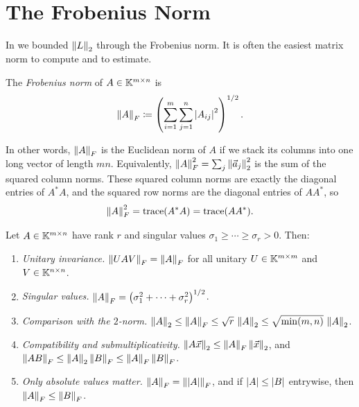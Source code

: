 \section{The Frobenius Norm}
\label{sec:frobenius}

In  we bounded $\left\lVert L \right\rVert_2$ through the Frobenius norm. It is often the easiest matrix norm to compute and to estimate.

\begin{definition}
  The \emph{Frobenius norm} of $A \in \mathbb{K}^{m \times n}$ is
  \begin{equation}
    \left\lVert A \right\rVert_F \coloneqq \left(\sum_{i=1}^{m}\sum_{j=1}^{n}\left\lvert A_{ij} \right\rvert^2\right)^{1/2}.
  \end{equation}
\end{definition}

In other words, $\left\lVert A \right\rVert_F$ is the Euclidean norm of $A$ if we stack its columns into one long vector of length $mn$. Equivalently, $\left\lVert A \right\rVert_F^2 = \sum_j\left\lVert \vec{a}_j \right\rVert_2^2$ is the sum of the squared column norms. These squared column norms are exactly the diagonal entries of $A^\ast A$, and the squared row norms are the diagonal entries of $AA^\ast$, so
\begin{equation}
  \left\lVert A \right\rVert_F^2 = \operatorname{trace}(A^\ast A) = \operatorname{trace}(AA^\ast).
\end{equation}

\begin{proposition}
  \label{prop:frobenius}
  Let $A \in \mathbb{K}^{m \times n}$ have rank $r$ and singular values $\sigma_1 \ge \cdots \ge \sigma_r > 0$. Then:
  \begin{enumerate}
    \item \emph{Unitary invariance.} $\left\lVert UAV \right\rVert_F = \left\lVert A \right\rVert_F$ for all unitary $U \in \mathbb{K}^{m \times m}$ and $V \in \mathbb{K}^{n \times n}$.
    \item \emph{Singular values.} $\left\lVert A \right\rVert_F = \left(\sigma_1^2 + \cdots + \sigma_r^2\right)^{1/2}$.
    \item \emph{Comparison with the $2$-norm.} $\left\lVert A \right\rVert_2 \le \left\lVert A \right\rVert_F \le \sqrt{r}\,\left\lVert A \right\rVert_2 \le \sqrt{\min(m, n)}\,\left\lVert A \right\rVert_2$.
    \item \emph{Compatibility and submultiplicativity.} $\left\lVert A\vec{x} \right\rVert_2 \le \left\lVert A \right\rVert_F\left\lVert \vec{x} \right\rVert_2$, and $\left\lVert AB \right\rVert_F \le \left\lVert A \right\rVert_2\left\lVert B \right\rVert_F \le \left\lVert A \right\rVert_F\left\lVert B \right\rVert_F$.
    \item \emph{Only absolute values matter.} $\left\lVert A \right\rVert_F = \left\lVert \left\lvert A \right\rvert \right\rVert_F$, and if $\left\lvert A \right\rvert \le \left\lvert B \right\rvert$ entrywise, then $\left\lVert A \right\rVert_F \le \left\lVert B \right\rVert_F$.
  \end{enumerate}
\end{proposition}

